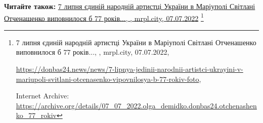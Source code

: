  
 
 
 
 

\def\pubIA{https://archive.org/details/07_07_2022.olga_demidko.donbas24.otchenashenko_77_rokiv}
\def\pubTitle{7 липня єдиній народній артистці України в Маріуполі Світлані Отченашенко виповнилося б 77 років...}
\def\pubDate{07.07.2022}
\def\pubOrigin{https://donbas24.news/news/7-lipnya-jedinii-narodnii-artistci-ukrayini-v-mariupoli-svitlani-otcenasenko-vipovnilosya-b-77-rokiv-foto}
\def\pubAuthor{\pubAuthorDemidko}

\textbf{Читайте також:} \href{\pubIA}{%
\pubTitle, \pubAuthor, mrpl.city, \pubDate}%
\footnote{\pubTitle, \pubAuthor, mrpl.city, \pubDate, \par\url{\pubOrigin}, \par Internet Archive: \url{\pubIA}}
